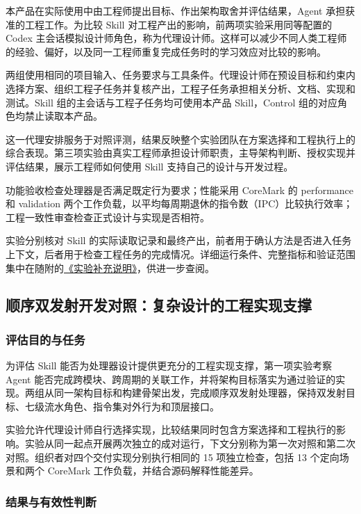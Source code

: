 \documentclass[UTF8,fontset=none,zihao=-4,a4paper]{ctexart}
\begin{document}
本产品在实际使用中由工程师提出目标、作出架构取舍并评估结果，Agent 承担获准的工程工作。为比较 Skill 对工程产出的影响，前两项实验采用同等配置的 Codex 主会话模拟设计师角色，称为代理设计师。这样可以减少不同人类工程师的经验、偏好，以及同一工程师重复完成任务时的学习效应对比较的影响。

两组使用相同的项目输入、任务要求与工具条件。代理设计师在预设目标和约束内选择方案、组织工程子任务并复核产出，工程子任务承担相关分析、文档、实现和测试。Skill 组的主会话与工程子任务均可使用本产品 Skill，Control 组的对应角色均禁止读取本产品。

这一代理安排服务于对照评测，结果反映整个实验团队在方案选择和工程执行上的综合表现。第三项实验由真实工程师承担设计师职责，主导架构判断、授权实现并评估结果，展示工程师如何使用 Skill 支持自己的设计与开发过程。

功能验收检查处理器是否满足既定行为要求；性能采用 CoreMark 的 performance 和 validation 两个工作负载，以平均每周期退休的指令数（IPC）比较执行效率；工程一致性审查检查正式设计与实现是否相符。

实验分别核对 Skill 的实际读取记录和最终产出，前者用于确认方法是否进入任务上下文，后者用于检查工程任务的完成情况。详细运行条件、完整指标和验证范围集中在随附的\href{EXPERIMENT_SUPPLEMENT.pdf}{《实验补充说明》}，供进一步查阅。

\subsection{顺序双发射开发对照：复杂设计的工程实现支撑}

\subsubsection{评估目的与任务}

为评估 Skill 能否为处理器设计提供更充分的工程实现支撑，第一项实验考察 Agent 能否完成跨模块、跨周期的关联工作，并将架构目标落实为通过验证的实现。两组从同一架构目标和构建骨架出发，完成顺序双发射处理器，保持双发射目标、七级流水角色、指令集对外行为和顶层接口。

实验允许代理设计师自行选择实现，比较结果同时包含方案选择和工程执行的影响。实验从同一起点开展两次独立的成对运行，下文分别称为第一次对照和第二次对照。组织者对四个交付实现分别执行相同的 15 项独立检查，包括 13 个定向场景和两个 CoreMark 工作负载，并结合源码解释性能差异。

\subsubsection{结果与有效性判断}
\end{document}
